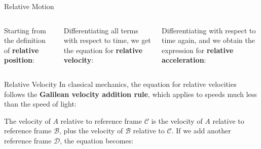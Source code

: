 \documentclass[12pt,compress,aspectratio=169,dvipsnames]{beamer}
\begin{document}
\begin{frame}{Relative Motion}
  \begin{columns}

    Starting from the definition of \textbf{relative position}:

    
    \vspace{-.2in}Differentiating all terms with respect to time, we get the
    equation for \textbf{relative velocity}:


    \vspace{-.2in}Differentiating with respect to time again, and we obtain the
    expression for \textbf{relative acceleration}:

  \end{columns}
\end{frame}



\begin{frame}{Relative Velocity}
  In classical mechanics, the equation for relative velocities follows the
  \textbf{Galilean velocity addition rule}, which applies to speeds much less
  than the speed of light:


  The velocity of $A$ relative to reference frame $\mathcal C$ is the velocity
  of $A$ relative to reference frame $\mathcal B$, plus the velocity of
  $\mathcal B$ relative to $\mathcal C$. If we add another reference frame
  $\mathcal D$, the equation becomes:

\end{frame}
\end{document}
